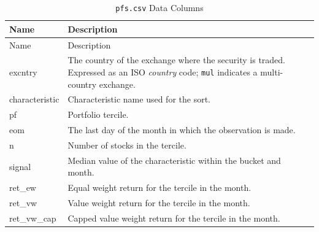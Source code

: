 \documentclass[12pt,title,fleqn]{article}
\begin{document}
{\scriptsize
	\begin{longtable}{@{\extracolsep{\fill}}|l|m{14.2cm}|@{}}
	\caption{\texttt{pfs.csv} Data Columns \label{pfs-monthly}}\\
	
	\hline
	Name & Description \\
	\hline
	\endfirsthead
	
	\hline
	Name & Description \\
	\hline
	\endhead
	
	\hline
	\endfoot
	
	
	\hline\hline
	\endlastfoot
	
	excntry\rule{0pt}{10pt} & The country of the exchange where the security is traded. Expressed as an ISO \emph{country} code; \texttt{mul} indicates a multi-country exchange. \\[1ex]
	
	characteristic & Characteristic name used for the sort. \\[1ex]
	
	pf & Portfolio tercile. \\[1ex]
	
	eom & The last day of the month in which the observation is made. \\[1ex]

	n & Number of stocks in the tercile. \\[1ex]
    
	signal & Median value of the characteristic within the bucket and month. \\[1ex]

	ret\_ew & Equal weight return for the tercile in the month.\\[1ex]

	ret\_vw & Value weight return for the tercile in the month.\\[1ex]

	ret\_vw\_cap & Capped value weight return for the tercile in the month.\\[1ex]

\end{longtable}}
\end{document}
